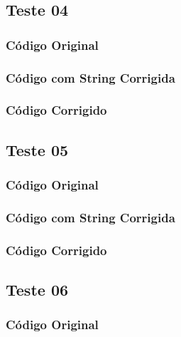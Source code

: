 \subsection{Teste 04}
\label{subsec:lexicoTeste04}

\subsubsection{Código Original}


\subsubsection{Código com String Corrigida}


\subsubsection{Código Corrigido}


\subsection{Teste 05}
\label{subsec:lexicoTeste05}

\subsubsection{Código Original}


\subsubsection{Código com String Corrigida}


\subsubsection{Código Corrigido}


\subsection{Teste 06}
\label{subsec:lexicoTeste06}

\subsubsection{Código Original}


